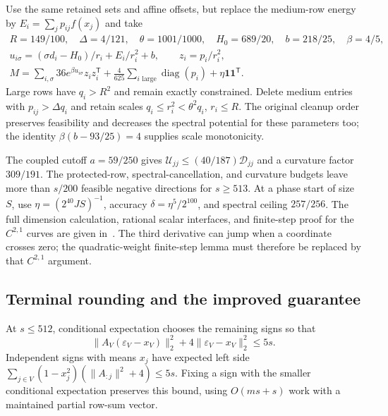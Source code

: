 \documentclass[11pt]{amsart}
\theoremstyle{definition}\newtheorem{definition}[theorem]{Definition}
\theoremstyle{remark}\newtheorem{remark}[theorem]{Remark}
\numberwithin{equation}{section}
\newcommand{\diag}{\operatorname{diag}}
\newcommand{\one}{\mathbf1}
\newcommand{\T}{\mathsf T}
\begin{document}
Use the same retained sets and affine offsets, but replace the medium-row
energy by $E_i=\sum_jp_{ij}f(x_j)$ and take
\begin{equation}\label{opt:parameters}
 \begin{gathered}
 R=149/100,\quad \Delta=4/121,\quad \theta=1001/1000,\quad
 H_0=689/20,\quad b=218/25,\quad \beta=4/5,\\
 u_{i\sigma}=(\sigma d_i-H_0)/r_i+E_i/r_i^2+b,\qquad z_i=p_i/r_i^2,\\
 M=\sum_{i,\sigma}36e^{\beta u_{i\sigma}}z_iz_i^\T
   +\frac4{625}\sum_{i\text{ large}}\diag(p_i)+\eta\one\one^\T.
 \end{gathered}
\end{equation}
Large rows have $q_i>R^2$ and remain exactly constrained. Delete medium
entries with $p_{ij}>\Delta q_i$ and retain scales
$q_i\le r_i^2<\theta^2q_i$, $r_i\le R$. The original cleanup order
preserves feasibility and decreases the spectral potential for these
parameters too; the identity $\beta(b-93/25)=4$ supplies scale
monotonicity.

The coupled cutoff $a=59/250$ gives
$\mathcal U_{jj}\le(40/187)\mathcal D_{jj}$ and a curvature factor
$309/191$. The protected-row, spectral-cancellation, and curvature
budgets leave more than $s/200$ feasible negative directions for
$s\ge513$. At a phase start of size $S$, use
$\eta=(2^{40}JS)^{-1}$, accuracy $\delta=\eta^5/2^{100}$,
and spectral ceiling $257/256$. The full dimension calculation,
rational scalar interfaces, and finite-step proof for the $C^{2,1}$
curves are given in~\cite[Sections~4--7 and 9]{Below67}.
The third derivative can jump when a coordinate crosses zero; the
quadratic-weight finite-step lemma must therefore be replaced by that
$C^{2,1}$ argument.

\subsection{Terminal rounding and the improved guarantee}
At $s\le512$, conditional expectation chooses the remaining signs so that
\begin{equation}\label{opt:rounding}
 \|A_V(\varepsilon_V-x_V)\|_2^2+
       4\|\varepsilon_V-x_V\|_2^2\le5s.
\end{equation}
Independent signs with means $x_j$ have expected left side
$\sum_{j\in V}(1-x_j^2)(\|A_{:j}\|^2+4)\le5s$.
Fixing a sign with the smaller conditional expectation preserves this
bound, using $O(ms+s)$ work with a maintained partial row-sum vector.
\end{document}
